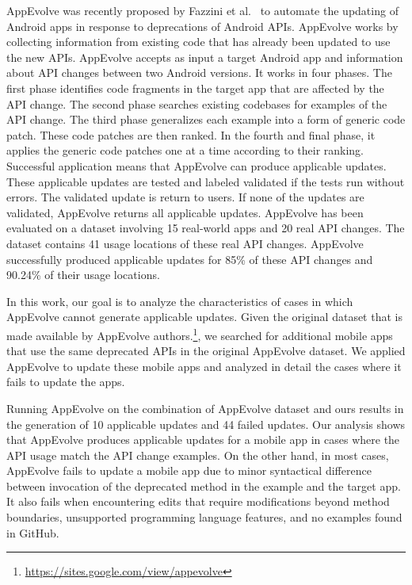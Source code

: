 AppEvolve was recently proposed by Fazzini et al.~\cite{fazzini2019automated} to
automate the updating of Android apps in response to deprecations of
Android APIs.  AppEvolve works by collecting information from existing code
that has already been updated to use the new APIs. 
AppEvolve accepts as input a target Android app and information about API changes between two Android versions. It works in four phases. The first phase identifies code fragments in the target app that are affected by the API change. The second phase searches existing codebases for examples of the API change. The third phase generalizes each example into a form of generic code patch. These code patches are then ranked. In the fourth and final phase, it applies the generic code patches one at a time according to their ranking. Successful application means that AppEvolve can produce applicable updates. These applicable updates are tested and labeled validated if the tests run without errors. The validated update is return to users. If none of the updates are validated, AppEvolve returns all applicable updates. AppEvolve has been evaluated on a dataset involving 15 real-world apps and 20 real API changes. The dataset contains 41 usage locations of these real API changes. AppEvolve successfully produced applicable updates for 85\% of these API changes and 90.24\% of their usage locations. 

In this work, our goal is to analyze the characteristics of cases in which AppEvolve cannot generate applicable updates. Given the original dataset that is made available by AppEvolve authors.\footnote{\url{https://sites.google.com/view/appevolve}}, we searched for additional mobile apps that use the same deprecated APIs in the original AppEvolve dataset. We applied AppEvolve to update these mobile apps and analyzed in detail the cases where it fails to update the apps.

Running AppEvolve on the combination of AppEvolve dataset and ours results in the generation of 10 applicable updates and 44 failed updates. Our analysis shows that AppEvolve produces applicable updates for a mobile app in cases where the API usage match the API change examples.  On the other hand, in most cases, AppEvolve fails to update a mobile app due to minor syntactical difference between invocation of the deprecated method in the example and the target app. It also fails when encountering edits that require modifications beyond method boundaries, unsupported programming language features, and no examples found in GitHub.

